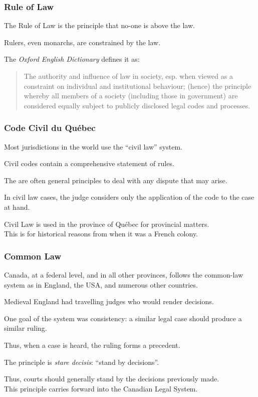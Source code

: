 \begin{frame}
\frametitle{Rule of Law}

The \alert{Rule of Law} is the principle that no-one is above the law.

Rulers, even monarchs, are constrained by the law. 

The \textit{Oxford English Dictionary} defines it as:

\begin{quote}
The authority and influence of law in society, esp. when viewed as a constraint on individual and institutional behaviour; (hence) the principle whereby all members of a society (including those in government) are considered equally subject to publicly disclosed legal codes and processes.
\end{quote}

\end{frame}



\begin{frame}
\frametitle{Code Civil du Qu\'ebec}

Most jurisdictions in the world use the ``civil law'' system.

Civil codes contain a comprehensive statement of rules. 

The are often general principles to deal with any dispute that may arise.

In civil law cases, the judge considers only the application of the code to the case at hand.

Civil Law is used in the province of Qu\'ebec for provincial matters.\\
\quad This is for historical reasons from when it was a French colony.

\end{frame}



\begin{frame}
\frametitle{Common Law}

Canada, at a federal level, and in all other provinces, follows the common-law system as in England, the USA, and numerous other countries.

Medieval England had travelling judges who would render decisions.

One goal of the system was consistency: a similar legal case should produce a similar ruling.

Thus, when a case is heard, the ruling forms a \alert{precedent}.

The principle is \textit{stare decisis}: ``stand by decisions''.

Thus, courts should generally stand by the decisions previously made.\\
\quad This principle carries forward into the Canadian Legal System.

\end{frame}



